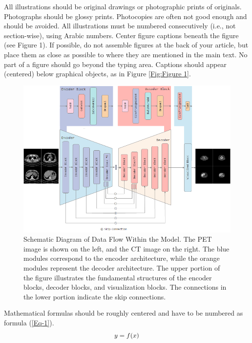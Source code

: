 \documentclass[a4paper, times, 10pt,twocolumn]{article}
\begin{document}
All illustrations should be original drawings or photographic prints
of originals. Photographs should be glossy prints. Photocopies are
often not good enough and should be avoided. All illustrations must
be numbered consecutively (i.e., not section-wise), using Arabic
numbers.  Center figure captions beneath the figure (see Figure 1).
If possible, do not assemble figures at the back of your article,
but place them as close as possible to where they are mentioned in
the main text. No part of a figure should go beyond the typing area.
Captions should appear (centered) below graphical objects, as in
Figure \ref{Fig:Figure 1}.
\begin{figure}[t!]
	\centering
	\includegraphics[width=1.0\linewidth]{u-net/lung/Encoder-Decoder-5layer-250406}
	\caption[architecture]{Schematic Diagram of Data Flow Within the Model. The PET image is shown on the left, and the CT image on the right. The blue modules correspond to the encoder architecture, while the orange modules represent the decoder architecture. The upper portion of the figure illustrates the fundamental structures of the encoder blocks, decoder blocks, and visualization blocks. The connections in the lower portion indicate the skip connections.}
	\label{fig:Encoder_Decoder_Pair}
\end{figure}


Mathematical formulas should be roughly centered and have to be
numbered as formula (\ref{Eq-1}).
\begin{equation}\label{Eq-1}
\centering{y=f(x)}
\end{equation}
\end{document}
